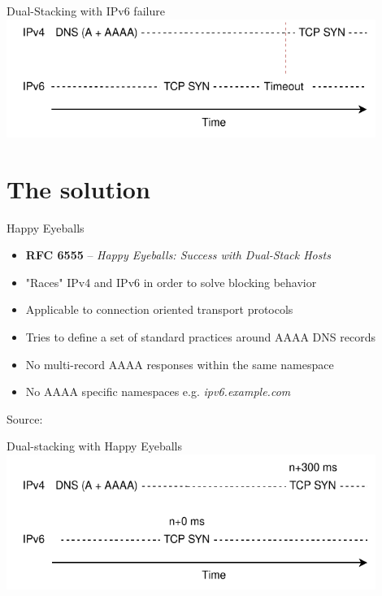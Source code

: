 \documentclass[aspectratio=169]{beamer}
\begin{document}
\begin{frame}{Dual-Stacking with IPv6 failure}
  \centering
  \includegraphics[width=0.9\textwidth]{nohe.pdf}
\end{frame}

\section{The solution}

\begin{frame}{Happy Eyeballs}
  \begin{itemize}
    \item \textbf{RFC 6555} – \emph{Happy Eyeballs: Success with Dual-Stack Hosts}
    \item "Races" IPv4 and IPv6 in order to solve blocking behavior
    \item Applicable to connection oriented transport protocols
    \item Tries to define a set of standard practices around AAAA DNS records
    \item No multi-record AAAA responses within the same namespace
    \item No AAAA specific namespaces e.g. \textit{ipv6.example.com}
  \end{itemize}
  \centering
  {\tiny Source: \parencite{wingHappyEyeballsSuccess2012}}
\end{frame}

\begin{frame}{Dual-stacking with Happy Eyeballs}
  \centering
  \includegraphics[width=0.9\textwidth]{withhe.pdf}
\end{frame}
\end{document}
